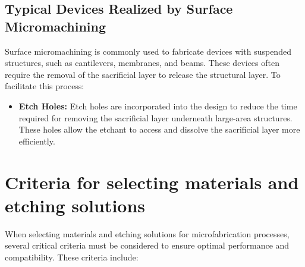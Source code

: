 \documentclass{report}
\begin{document}
\subsection{Typical Devices Realized by Surface Micromachining}
Surface micromachining is commonly used to fabricate devices with suspended structures, such as cantilevers, membranes, and beams. These devices often require the removal of the sacrificial layer to release the structural layer. To facilitate this process:
\begin{itemize}
    \item \textbf{Etch Holes:} Etch holes are incorporated into the design to reduce the time required for removing the sacrificial layer underneath large-area structures. These holes allow the etchant to access and dissolve the sacrificial layer more efficiently.
\end{itemize}

\section{Criteria for selecting materials and etching solutions}
When selecting materials and etching solutions for microfabrication processes, several critical criteria must be considered to ensure optimal performance and compatibility. These criteria include:
\end{document}
